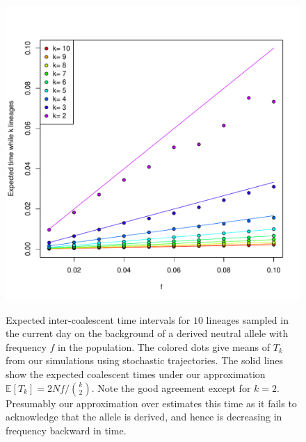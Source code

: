 \documentclass[a4paper,10pt]{article}
\begin{document}
\begin{figure}
	\includegraphics[width = \textwidth]{../Paper_Figures/mean_coal_times_derived.pdf} \label{mean_coal_times_supp_plot}
\caption{Expected inter-coalescent time intervals for $10$ lineages sampled in the current day on the background of a derived neutral allele with frequency $f$ in the population. 
The colored dots give means of $T_k$ from our simulations using stochastic trajectories. The solid lines show the expected coalescent times 
under our approximation $ \mathbb{E} [T_k] = 2Nf/{k \choose 2}$. Note the good agreement except for $k=2$. Presumably our approximation over estimates this time as it fails to acknowledge that the allele is derived, and hence is decreasing in frequency backward in time. }
\end{figure} %
\end{document}
